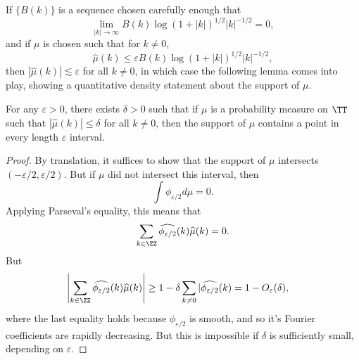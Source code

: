 If $\{ B(k) \}$ is a sequence chosen carefully enough that
%
\[ \lim_{|k| \to \infty} B(k) \log(1 + |k|)^{1/2} |k|^{-1/2} = 0, \]
%
and if $\mu$ is chosen such that for $k \neq 0$,
%
\[ \widehat{\mu}(k) \leq \varepsilon B(k) \log(1 + |k|)^{1/2} |k|^{-1/2}, \]
%
then $|\widehat{\mu}(k)| \lesssim \varepsilon$ for all $k \neq 0$, in which case the following lemma comes into play, showing a quantitative density statement about the support of $\mu$.

\begin{lemma}
	For any $\varepsilon > 0$, there exists $\delta > 0$ such that if $\mu$ is a probability measure on $\TT$ such that $|\widehat{\mu}(k)| \leq \delta$ for all $k \neq 0$, then the support of $\mu$ contains a point in every length $\varepsilon$ interval.
\end{lemma}
\begin{proof}
	By translation, it suffices to show that the support of $\mu$ intersects $(-\varepsilon/2,\varepsilon/2)$. But if $\mu$ did not intersect this interval, then
	\[ \int \phi_{\varepsilon/2} d\mu = 0. \]
	Applying Parseval's equality, this means that
	\[ \sum_{k \in \ZZ} \widehat{\phi_{\varepsilon/2}}(k) \widehat{\mu}(k) = 0. \]
	But
	\begin{align*}
		\left| \sum_{k \in \ZZ} \widehat{\phi_{\varepsilon/2}}(k) \widehat{\mu}(k) \right| &\geq 1 - \delta \sum_{k \neq 0} |\widehat{\phi_{\varepsilon/2}}(k) = 1 - O_\varepsilon(\delta),
	\end{align*}
	where the last equality holds because $\phi_{\varepsilon/2}$ is smooth, and so it's Fourier coefficients are rapidly decreasing. But this is impossible if $\delta$ is sufficiently small, depending on $\varepsilon$.
\end{proof}


